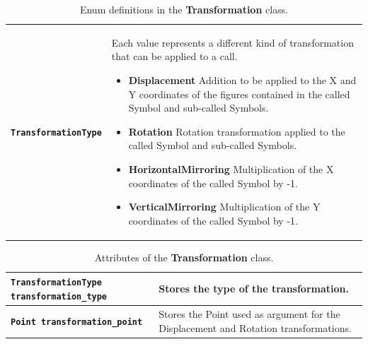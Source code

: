 \documentclass[11pt,twoside,openany,x11names,svgnames]{memoir}
\begin{document}
\begin{table}[h]\footnotesize
\centering
\begin{tabular}{| >{\bfseries}p{3cm} | p{12.5cm} |}
	\hline
	
	\texttt{TransformationType} & \parbox[t]{12.5cm}{Each value represents a different kind of transformation that can be applied to a call.\\
	                                                 \begin{itemize}
						                         	 	\item \textbf{Displacement} Addition to be applied to the X and Y coordinates of the figures contained in the called Symbol and sub-called Symbols.
						                             	\item \textbf{Rotation} Rotation transformation applied to the called Symbol and sub-called Symbols.
						                             	\item \textbf{HorizontalMirroring} Multiplication of the X coordinates of the called Symbol by -1.
						                             	\item \textbf{VerticalMirroring} Multiplication of the Y coordinates of the called Symbol by -1.
						                     \end{itemize}
						                    } \\
	
	\hline		
\end{tabular}
\caption{Enum definitions in the \textbf{Transformation} class.}
\label{tab:Transformation-Types}
\end{table}

\begin{table}[h]\footnotesize
\centering
\begin{tabular}{| >{\bfseries}p{6.5cm} | p{9cm} |}
	\hline
	
	\texttt{TransformationType transformation\_type} & Stores the type of the transformation. \\
	
	\hline
	
	\texttt{Point transformation\_point} & Stores the Point used as argument for the Displacement and Rotation transformations. \\
	
	\hline
\end{tabular}
\caption{Attributes of the \textbf{Transformation} class.}
\label{tab:Transformation-Attributes}
\end{table}
\end{document}
